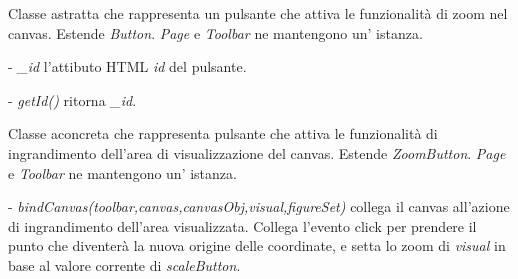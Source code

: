 Classe astratta che rappresenta un pulsante che attiva le funzionalit\` a di zoom nel canvas.
Estende \textit{Button}.
\textit{Page} e \textit{Toolbar} ne mantengono un' istanza.
\begin{elencopuntato}[\subsubsecindent]
\item[-] \textit{{\_}id} l'attibuto HTML \textit{id} del pulsante.
\end{elencopuntato}
\begin{elencopuntato}[\subsubsecindent]
\item[-] \textit{getId()} ritorna \textit{{\_}id}.
\end{elencopuntato}

Classe aconcreta che rappresenta pulsante che attiva le funzionalit\` a di ingrandimento dell'area di visualizzazione del canvas.
Estende \textit{ZoomButton}.
\textit{Page} e \textit{Toolbar} ne mantengono un' istanza.
\begin{elencopuntato}[\subsubsecindent]
\item[-] \textit{bindCanvas(toolbar,canvas,canvasObj,visual,figureSet)} collega il canvas all'azione di ingrandimento dell'area visualizzata. Collega l'evento click per prendere il punto che diventer\`a la nuova origine delle coordinate, e setta lo zoom di \textit{visual} in base al valore corrente di \textit{scaleButton}.
\end{elencopuntato}

